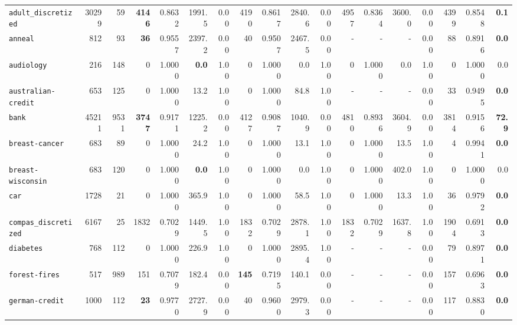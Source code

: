 \begin{tabular}{lccrrrrrrrrrrrrrrr}
\texttt{adult\_discretized} & \multicolumn{1}{r}{30299} & \multicolumn{1}{r}{59}  & \textbf{4146} & 0.8632 & 1991.5 & 0.00 & 4190 & 0.8617 & 2840.6 & 0.00 & 4957 & 0.8364 & 3600.0 & 0.00 & 4399 & 0.8548 & \textbf{0.1}\\
\texttt{anneal} & \multicolumn{1}{r}{812} & \multicolumn{1}{r}{93}  & \textbf{36} & 0.9557 & 2397.2 & 0.00 & 40 & 0.9507 & 2467.5 & 0.00 & - & - & - & 0.00 & 88 & 0.8916 & \textbf{0.0}\\
\texttt{audiology} & \multicolumn{1}{r}{216} & \multicolumn{1}{r}{148}  & 0 & 1.0000 & \textbf{0.0} & 1.00 & 0 & 1.0000 & 0.0 & 1.00 & 0 & 1.0000 & 0.0 & 1.00 & 0 & 1.0000 & 0.0\\
\texttt{australian-credit} & \multicolumn{1}{r}{653} & \multicolumn{1}{r}{125}  & 0 & 1.0000 & 13.2 & 1.00 & 0 & 1.0000 & 84.8 & 1.00 & - & - & - & 0.00 & 33 & 0.9495 & \textbf{0.0}\\
\texttt{bank} & \multicolumn{1}{r}{45211} & \multicolumn{1}{r}{9531}  & \textbf{3747} & 0.9171 & 1225.2 & 0.00 & 4127 & 0.9087 & 1040.9 & 0.00 & 4810 & 0.8936 & 3604.9 & 0.00 & 3814 & 0.9156 & \textbf{72.9}\\
\texttt{breast-cancer} & \multicolumn{1}{r}{683} & \multicolumn{1}{r}{89}  & 0 & 1.0000 & 24.2 & 1.00 & 0 & 1.0000 & 13.1 & 1.00 & 0 & 1.0000 & 13.5 & 1.00 & 4 & 0.9941 & \textbf{0.0}\\
\texttt{breast-wisconsin} & \multicolumn{1}{r}{683} & \multicolumn{1}{r}{120}  & 0 & 1.0000 & \textbf{0.0} & 1.00 & 0 & 1.0000 & 0.0 & 1.00 & 0 & 1.0000 & 402.0 & 1.00 & 0 & 1.0000 & 0.0\\
\texttt{car} & \multicolumn{1}{r}{1728} & \multicolumn{1}{r}{21}  & 0 & 1.0000 & 365.9 & 1.00 & 0 & 1.0000 & 58.5 & 1.00 & 0 & 1.0000 & 13.3 & 1.00 & 36 & 0.9792 & \textbf{0.0}\\
\texttt{compas\_discretized} & \multicolumn{1}{r}{6167} & \multicolumn{1}{r}{25}  & 1832 & 0.7029 & 1449.5 & 1.00 & 1832 & 0.7029 & 2878.1 & 1.00 & 1832 & 0.7029 & 1637.8 & 1.00 & 1904 & 0.6913 & \textbf{0.0}\\
\texttt{diabetes} & \multicolumn{1}{r}{768} & \multicolumn{1}{r}{112}  & 0 & 1.0000 & 226.9 & 1.00 & 0 & 1.0000 & 2895.4 & 1.00 & - & - & - & 0.00 & 79 & 0.8971 & \textbf{0.0}\\
\texttt{forest-fires} & \multicolumn{1}{r}{517} & \multicolumn{1}{r}{989}  & 151 & 0.7079 & 182.4 & 0.00 & \textbf{145} & 0.7195 & 140.1 & 0.00 & - & - & - & 0.00 & 157 & 0.6963 & \textbf{0.0}\\
\texttt{german-credit} & \multicolumn{1}{r}{1000} & \multicolumn{1}{r}{112}  & \textbf{23} & 0.9770 & 2727.9 & 0.00 & 40 & 0.9600 & 2979.3 & 0.00 & - & - & - & 0.00 & 117 & 0.8830 & \textbf{0.0}\\

\end{tabular}

